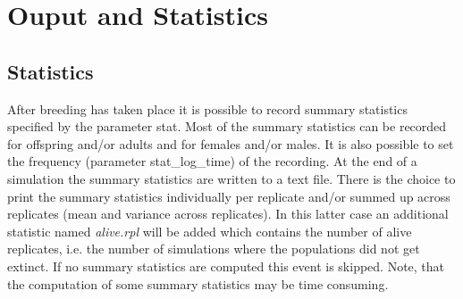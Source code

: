 \documentclass[letterpaper,12pt,oneside]{book}
\begin{document}
\chapter{Ouput and Statistics}
\label{chap:statistic}
\section{Statistics}\label{2statistics}
After breeding has taken place it is possible to record summary statistics specified by the parameter \textsf{stat}. Most of the summary statistics can be recorded for offspring and/or adults and for females and/or males. It is also possible to set the frequency (parameter \textsf{stat\_log\_time}) of the recording. At the end of a simulation the summary statistics are written to a text file. There is the choice to print the summary statistics individually per replicate and/or summed up across replicates (mean and variance across replicates). In this latter case an additional statistic named \textit{alive.rpl} will be added which contains the number of alive replicates, i.e. the number of simulations where the populations did not get extinct. If no summary statistics are computed this event is skipped. Note, that the computation of some summary statistics may be time consuming. 
\end{document}
